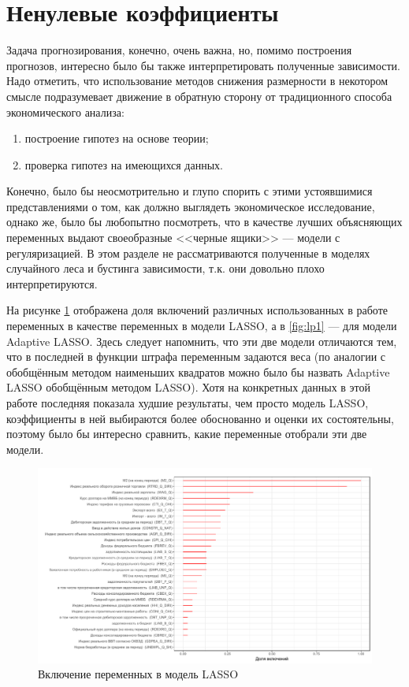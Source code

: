 \section{Ненулевые коэффициенты}
Задача прогнозирования, конечно, очень важна, но, помимо построения прогнозов, интересно было бы также интерпретировать полученные зависимости. Надо отметить, что использование методов снижения размерности в некотором смысле подразумевает движение в обратную сторону от традиционного способа экономического анализа:


\begin{enumerate}
    \item построение гипотез на основе теории;
\item проверка гипотез на имеющихся данных.
\end{enumerate}

Конечно, было бы неосмотрительно и глупо спорить с этими устоявшимися представлениями о том, как должно выглядеть экономическое исследование, однако же, было бы любопытно посмотреть, что в качестве лучших объясняющих переменных выдают своеобразные <<черные ящики>> --- модели с регуляризацией. В этом разделе не рассматриваются полученные в моделях случайного леса и бустинга зависимости, т.к. они довольно плохо интерпретируются.

На рисунке \ref{fig:lp2} отображена доля включений различных использованных в работе переменных в качестве переменных в модели LASSO, а в \ref{fig:lp1} --- для модели Adaptive LASSO. Здесь следует напомнить, что эти две модели отличаются тем, что в последней в функции штрафа переменным задаются веса (по аналогии с обобщённым методом наименьших квадратов можно было бы назвать Adaptive LASSO обобщённым методом LASSO). Хотя на конкретных данных в этой работе последняя показала худшие результаты, чем просто модель LASSO, коэффициенты в ней выбираются более обоснованно и оценки их состоятельны, поэтому было бы интересно сравнить, какие переменные отобрали эти две модели.
\begin{figure}[hp]
    \centering
    \includegraphics[width = \textwidth]{nzlollipop2.pdf}
    \caption{Включение переменных в модель LASSO}
    \label{fig:lp2}
\end{figure}

